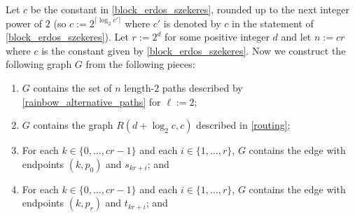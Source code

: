 \documentclass{patmorin}
\begin{document}
Let $c$ be the constant in \cref{block_erdos_szekeres}, rounded up to the next integer power of $2$ (so $c:=2^{\lceil\log_2 c'\rceil}$ where $c'$ is denoted by $c$ in the statement of \cref{block_erdos_szekeres}).  Let $r:=2^d$ for some positive integer $d$ and let $n:=cr$ where $c$ is the constant given by \cref{block_erdos_szekeres}.  Now we construct the following graph $G$ from the following pieces:
\begin{enumerate}
    \item $G$ contains the set of $n$ length-$2$ paths described by  \cref{rainbow_alternative_paths} for $\ell:=2$;
    \item $G$ contains the graph $R(d+\log_2 c,c)$ described in \cref{routing};
    \item For each $k\in\{0,\ldots,cr-1\}$ and each $i\in\{1,\ldots,r\}$, $G$ contains the edge with endpoints $(k,p_0)$ and $s_{kr+i}$; and
    \item For each $k\in\{0,\ldots,cr-1\}$ and each $i\in\{1,\ldots,r\}$, $G$ contains the edge with endpoints $(k,p_r)$ and $t_{kr+i}$; and
\end{enumerate}



\end{document}
